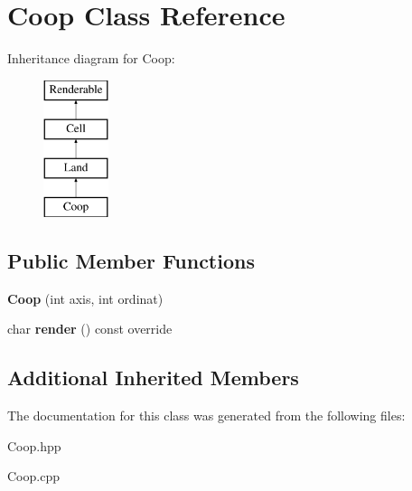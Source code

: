 \hypertarget{class_coop}{}\section{Coop Class Reference}
\label{class_coop}
Inheritance diagram for Coop\+:\begin{figure}[H]
\begin{center}
\leavevmode
\includegraphics[height=4.000000cm]{class_coop}
\end{center}
\end{figure}
\subsection*{Public Member Functions}
\begin{DoxyCompactItemize}
\item 
\mbox{\label{class_coop_aec31b94025f72d9bbff7f0f021ed29da}} 
{\bfseries Coop} (int axis, int ordinat)
\item 
\mbox{\label{class_coop_af1fc2ddad6749ddae14c13a403fca1d6}} 
char {\bfseries render} () const override
\end{DoxyCompactItemize}
\subsection*{Additional Inherited Members}


The documentation for this class was generated from the following files\+:\begin{DoxyCompactItemize}
\item 
Coop.\+hpp\item 
Coop.\+cpp\end{DoxyCompactItemize}
